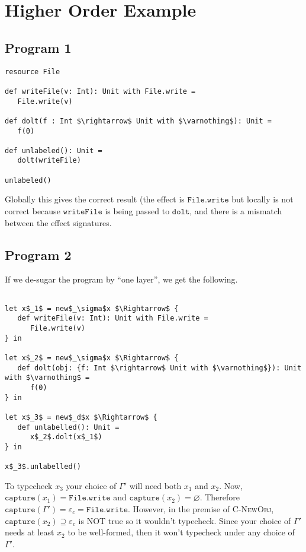 \documentclass{llncs}
\newcommand{\keywadj}[1]{\mathtt{#1}}
\newcommand{\kwa}[1]{\keywadj{ #1 }}
\begin{document}
\section{Higher Order Example}

\subsection{Program 1}

\begin{lstlisting}
resource File

def writeFile(v: Int): Unit with File.write =
   File.write(v)

def dolt(f : Int $\rightarrow$ Unit with $\varnothing$): Unit =
   f(0)

def unlabeled(): Unit =
   dolt(writeFile)

unlabeled()
\end{lstlisting}

\noindent
Globally this gives the correct result (the effect is $\kwa{File.write}$ but locally is not correct because $\kwa{writeFile}$ is being passed to $\kwa{dolt}$, and there is a mismatch between the effect signatures. \\

\subsection{Program 2}

\noindent
If we de-sugar the program by ``one layer'', we get the following.

\begin{lstlisting}

let x$_1$ = new$_\sigma$x $\Rightarrow$ {
   def writeFile(v: Int): Unit with File.write =
      File.write(v)
} in

let x$_2$ = new$_\sigma$x $\Rightarrow$ {
   def dolt(obj: {f: Int $\rightarrow$ Unit with $\varnothing$}): Unit with $\varnothing$ =
      f(0)
} in

let x$_3$ = new$_d$x $\Rightarrow$ {
   def unlabelled(): Unit =
      x$_2$.dolt(x$_1$)
} in

x$_3$.unlabelled()
\end{lstlisting}

\noindent
To typecheck $x_3$ your choice of $\Gamma'$ will need both $x_1$ and $x_2$. Now, $\kwa{capture}(x_1) = \kwa{File.write}$ and $\kwa{capture}(x_2) = \varnothing$. Therefore $\kwa{capture}(\Gamma') = \varepsilon_c = \kwa{File.write}$. However, in the premise of \textsc{C-NewObj}, $\kwa{capture}(x_2) \supseteq \varepsilon_c$ is NOT true so it wouldn't typecheck. Since your choice of $\Gamma'$ needs at least $x_2$ to be well-formed, then it won't typecheck under any choice of $\Gamma'$.
\end{document}
